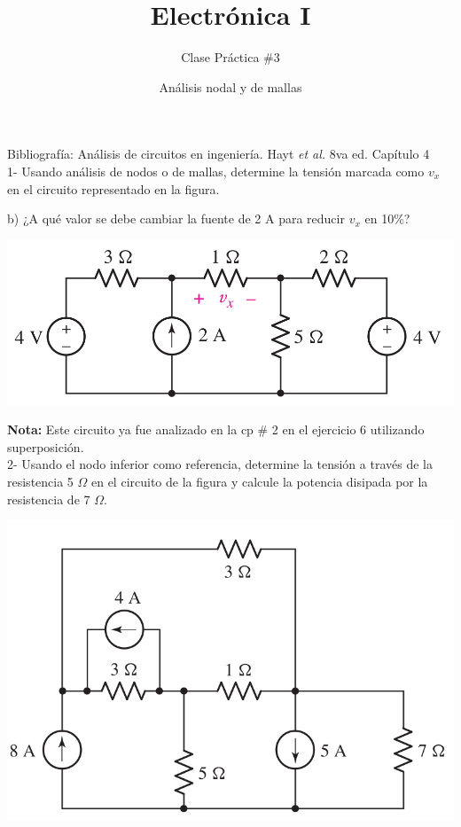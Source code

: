 \documentclass[10pt,letterpaper]{article}
\author{Clase Práctica $\#$3}
\title{Electrónica I}
\date{Análisis nodal y de mallas}
\begin{document}
	\maketitle
	
Bibliografía: Análisis de circuitos en ingeniería. Hayt \textit{et al.} 8va ed. Capítulo 4
\\
 
 1- Usando análisis de nodos o de mallas, determine la tensión marcada como $v_x$ en el circuito representado en la figura. 
 
 b) ¿A qué valor se debe cambiar la fuente de 2 A para reducir $v_x$ en 10\%?
 
  \includegraphics[scale=0.25]{c1}
  
  \textbf{Nota:} Este circuito ya fue analizado en la cp \# 2 en el ejercicio 6 utilizando superposición.
  \\
  
  	2- Usando el nodo inferior como referencia, determine la tensión a través de la resistencia 5 $\Omega$ en el circuito de la figura y calcule la potencia disipada por la resistencia de 7 $\Omega$.
  	
  	\includegraphics[scale=0.3]{c2}		
  	
\end{document}
